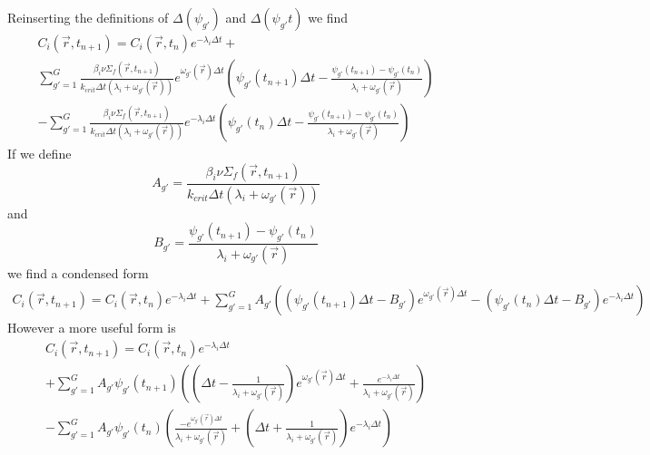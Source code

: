 \documentclass[12pt]{report}
\begin{document}
	Reinserting the definitions of $\Delta(\psi_{g'})$ and $\Delta(\psi_{g'}t)$ we find
	\begin{eqnarray}
	C_i(\vec{r},t_{n+1}) =  C_i(\vec{r},t_{n}) e^{-\lambda_i \Delta t} + \nonumber \\  \sum_{g'=1}^{G} \frac{\beta_i \nu\Sigma_f(\vec{r},t_{n+1})}{k_{crit} \Delta t \left(\lambda_i + \omega_{g'}(\vec{r})\right)} e^{ \omega_{g'}(\vec{r}) \Delta t} \left( \psi_{g'}(t_{n+1}) \Delta t - \frac{\psi_{g'}(t_{n+1})-\psi_{g'}(t_{n})}{\lambda_i + \omega_{g'}(\vec{r})} \right) \nonumber \\ 
	- \sum_{g'=1}^{G} \frac{\beta_i \nu\Sigma_f(\vec{r},t_{n+1})}{k_{crit} \Delta t \left(\lambda_i + \omega_{g'}(\vec{r})\right)} e^{-\lambda_i \Delta t} \left( \psi_{g'}(t_{n}) \Delta t - \frac{\psi_{g'}(t_{n+1})-\psi_{g'}(t_{n})}{\lambda_i + \omega_{g'}(\vec{r})} \right) \nonumber
	\end{eqnarray}
	If we define
	\begin{equation}
	A_{g'} = \frac{\beta_i \nu\Sigma_f(\vec{r},t_{n+1})}{k_{crit} \Delta t \left(\lambda_i + \omega_{g'}(\vec{r})\right)}
	\end{equation}
	and
	\begin{equation}
	B_{g'} = \frac{\psi_{g'}(t_{n+1})-\psi_{g'}(t_{n})}{\lambda_i + \omega_{g'}(\vec{r})}
	\end{equation}
	we find a condensed form
	\begin{eqnarray}
	C_i(\vec{r},t_{n+1}) =  C_i(\vec{r},t_{n}) e^{-\lambda_i \Delta t} +  \sum_{g'=1}^{G} A_{g'} \left( \left( \psi_{g'}(t_{n+1}) \Delta t - B_{g'} \right) e^{ \omega_{g'}(\vec{r}) \Delta t} - 
	\left( \psi_{g'}(t_n) \Delta t - B_{g'} \right) e^{-\lambda_i \Delta t} \right) \nonumber
	\end{eqnarray}
	However a more useful form is
	\begin{eqnarray}
	C_i(\vec{r},t_{n+1}) =  C_i(\vec{r},t_{n}) e^{-\lambda_i \Delta t} \nonumber \\ 
	+ \sum_{g'=1}^{G} A_{g'} \psi_{g'}(t_{n+1}) \left( \left( \Delta t - \frac{1}{\lambda_i + \omega_{g'}(\vec{r})} \right) e^{\omega_{g'}(\vec{r}) \Delta t} + \frac{e^{-\lambda_i \Delta t}}{\lambda_i + \omega_{g'}(\vec{r})} \right) \nonumber \\
	- \sum_{g'=1}^{G} A_{g'} \psi_{g'}(t_{n}) \left( \frac{-e^{\omega_{g'}(\vec{r}) \Delta t}}{\lambda_i + \omega_{g'}(\vec{r})} + \left(\Delta t + \frac{1}{\lambda_i + \omega_{g'}(\vec{r})} \right)e^{-\lambda_i \Delta t} \right) \nonumber
	\end{eqnarray}
\end{document}
